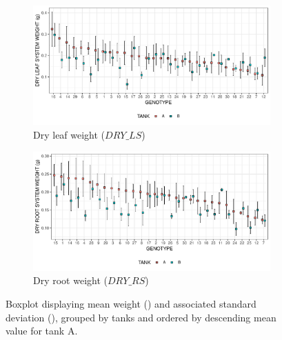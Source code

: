 \begin{table}[hbtp]
\begin{minipage}{0.45\textwidth}
 \end{minipage}
\label{tab:updated_germ_rates}
\end{table}


\begin{figure}
\centering
	\begin{subfigure}[t]{\textwidth}
	\label{fig:desc_stat_DRY_LS}
		\centering
		\includegraphics[width = \textwidth]{../../Figures/DRY_LS_summary_plot.pdf}
		\caption{Dry leaf weight ($DRY\_LS$)}
			\end{subfigure}

	\begin{subfigure}[t]{\textwidth}
		\centering
		\includegraphics[width = \textwidth]{../../Figures/DRY_RS_summary_plot.pdf}
		\caption{Dry root weight ($DRY\_RS$)}
	\end{subfigure}
	\caption[Boxplot of the mean weight and associated standard deviation]{Boxplot displaying mean weight (\protect\emptysquare) and associated standard deviation (\protect\blackline), grouped by tanks and ordered by descending mean value for tank A.}
\end{figure}
